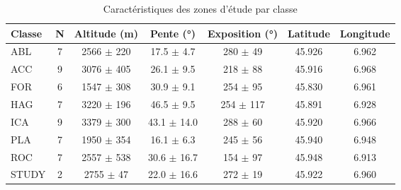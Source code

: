 
\begin{table}[htbp]
\centering
\caption{Caractéristiques des zones d'étude par classe}
\label{tab:study_areas}
\begin{tabular}{|l|c|c|c|c|c|c|}
\hline
\textbf{Classe} & \textbf{N} & \textbf{Altitude (m)} & \textbf{Pente (°)} & \textbf{Exposition (°)} & \textbf{Latitude} & \textbf{Longitude} \\
\hline
ABL & 7 & 2566 $\pm$ 220 & 17.5 $\pm$ 4.7 & 280 $\pm$ 49 & 45.926 & 6.962 \\
ACC & 9 & 3076 $\pm$ 405 & 26.1 $\pm$ 9.5 & 218 $\pm$ 88 & 45.916 & 6.968 \\
FOR & 6 & 1547 $\pm$ 308 & 30.9 $\pm$ 9.1 & 254 $\pm$ 95 & 45.830 & 6.961 \\
HAG & 7 & 3220 $\pm$ 196 & 46.5 $\pm$ 9.5 & 254 $\pm$ 117 & 45.891 & 6.928 \\
ICA & 9 & 3379 $\pm$ 300 & 43.1 $\pm$ 14.0 & 288 $\pm$ 60 & 45.920 & 6.966 \\
PLA & 7 & 1950 $\pm$ 354 & 16.1 $\pm$ 6.3 & 245 $\pm$ 56 & 45.940 & 6.948 \\
ROC & 7 & 2557 $\pm$ 538 & 30.6 $\pm$ 16.7 & 154 $\pm$ 97 & 45.948 & 6.913 \\
STUDY & 2 & 2755 $\pm$ 47 & 22.0 $\pm$ 16.6 & 272 $\pm$ 19 & 45.922 & 6.960 \\

\hline
\end{tabular}
\end{table}
